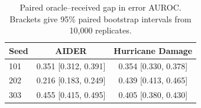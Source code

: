\begin{table}[t]
\centering
\caption{Paired oracle--received gap in error AUROC. Brackets give 95\% paired bootstrap intervals from 10,000 replicates.}
\label{tab:inflation}
\begin{tabular}{lcc}
\toprule
Seed & AIDER & Hurricane Damage \\
\midrule
101 & 0.351 [0.312, 0.391] & 0.354 [0.330, 0.378] \\
202 & 0.216 [0.183, 0.249] & 0.439 [0.413, 0.465] \\
303 & 0.455 [0.415, 0.495] & 0.405 [0.380, 0.430] \\
\bottomrule
\end{tabular}
\end{table}

